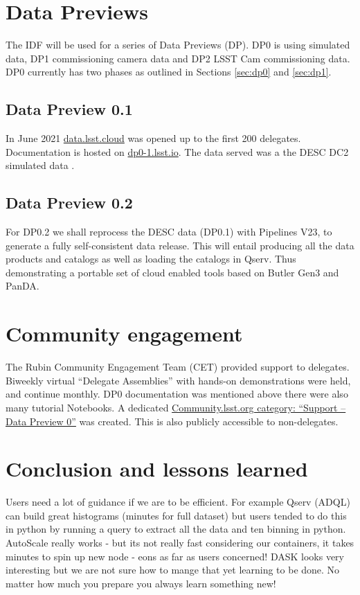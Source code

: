 \section {Data Previews}
The IDF will be used for a series of Data Previews (DP). DP0 is using simulated data, DP1 commissioning camera data
and DP2 LSST Cam commissioning data. DP0 currently has two phases as outlined in Sections \ref{sec:dp0} and \ref {sec:dp1}.

\subsection{Data Preview 0.1}\label{sec:dp01}
In June 2021  \href{  data.lsst.cloud}{data.lsst.cloud} was opened up to the first 200 delegates.
Documentation is hosted on \href{ dp0-1.lsst.io}{ dp0-1.lsst.io}.
The data served was a the DESC DC2 simulated data \citep{arXiv:2010.05926}.



\subsection{Data Preview 0.2}\label{sec:dp02}
For DP0.2 we shall reprocess the DESC data (DP0.1) with Pipelines V23, to generate a fully self-consistent data release.
This will entail producing all the data products and catalogs as well as loading the  catalogs in Qserv.
Thus demonstrating a portable set of cloud enabled tools based on Butler Gen3 and PanDA.


\section{Community engagement }
The Rubin Community Engagement Team (CET) provided support to delegates.
Biweekly virtual “Delegate Assemblies” with hands-on demonstrations were held, and continue monthly.
DP0 documentation was mentioned above there were also many tutorial Notebooks.
A dedicated \href{https://community.lsst.org/c/support/dp0/}{Community.lsst.org category: “Support -- Data Preview 0”} was created.
This is also publicly accessible to non-delegates.


\section{Conclusion and lessons learned}
Users need a lot of guidance if we are to be efficient.
For example Qserv (ADQL) can build great histograms (minutes for full dataset) but users
tended to do this in python by running a query to extract all the data and ten binning in python.
AutoScale really works - but its not really fast considering our containers, it takes minutes to spin up new node - eons as far as users concerned!
DASK looks very interesting but we are not sure how to mange that yet learning to be done.
No matter how much you prepare you always learn something new!

